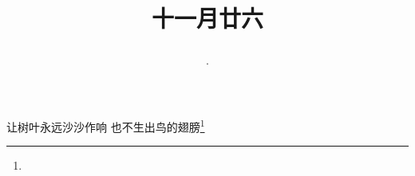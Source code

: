 \title{\date[d=7,m=1,y=2024][year:cn-y,年,month:cn,day:cn,日,·,weekday]·十一月廿六 }
让树叶永远沙沙作响 也不生出鸟的翅膀\footnote{ }

